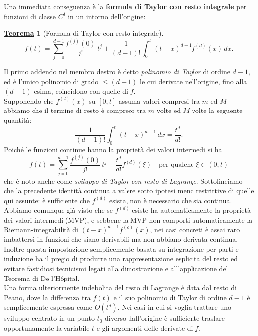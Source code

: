 \documentclass[a4paper,twoside]{article}
\theoremstyle{definition}
\newtheorem{theorem}{\color{Red}\underline{\textrm Teorema}}
\newenvironment{theo}
  {\begin{shaded}\begin{theorem}}
  {\end{theorem}\end{shaded}}
\numberwithin{theorem}{section}
\begin{document}
Una immediata conseguenza è la \textbf{formula di Taylor con resto integrale} per funzioni di classe $C^d$ in un intorno dell'origine:
\begin{theo}[Formula di Taylor con resto integrale]
 $$ f(t) = \sum_{j=0}^{d-1}\frac{f^{(j)}(0)}{j!}\,t^j + \frac{1}{(d-1)!}\int_{0}^{t}(t-x)^{d-1}f^{(d)}(x)\,dx. $$
\end{theo}
Il primo addendo nel membro destro è detto \emph{polinomio di Taylor} di ordine $d-1$, ed è l'unico polinomio di grado $\leq (d-1)$ le cui derivate nell'origine, fino alla $(d-1)$-esima, coincidono con quelle di $f$.\\
Supponendo che $f^{(d)}(x)$ su $[0,t]$ assuma valori compresi tra $m$ ed $M$ abbiamo che il termine di resto è compreso tra $m$ volte ed $M$ volte la seguente quantità:
$$ \frac{1}{(d-1)!}\int_{0}^{t}(t-x)^{d-1}\,dx = \frac{t^d}{d!}. $$
Poiché le funzioni continue hanno la proprietà dei valori intermedi si ha
$$ f(t) = \sum_{j=0}^{d-1}\frac{f^{(j)}(0)}{j!}\,t^j + \frac{t^d}{d!}f^{(d)}(\xi)\quad\text{per qualche }\xi\in(0,t) $$
che è noto anche come \emph{sviluppo di Taylor con resto di Lagrange}. Sottolineiamo che la precedente identità continua a valere sotto ipotesi meno restrittive di quelle qui assunte: è sufficiente che $f^{(d)}$ esista, non è necessario che sia continua. Abbiamo comunque già visto che se $f^{(d)}$ esiste ha automaticamente la proprietà dei valori intermedi (MVP), e sebbene la MVP non comporti automaticamente la Riemann-integrabilità di $(t-x)^{d-1}f^{(d)}(x)$, nei casi concreti è assai raro imbattersi in funzioni che siano derivabili ma non abbiano derivata continua. Inoltre questa impostazione semplicemente basata su integrazione per parti e induzione ha il pregio di produrre una rappresentazione esplicita del resto ed evitare fastidiosi tecnicismi legati alla dimostrazione e all'applicazione del Teorema di De l'H\^opital.\\
Una forma ulteriormente indebolita del resto di Lagrange è data dal resto di Peano, dove la differenza tra $f(t)$ e il suo polinomio di Taylor di ordine $d-1$ è semplicemente espressa come $O(t^d)$. Nei casi in cui si voglia trattare uno sviluppo centrato in un punto $t_0$ diverso dall'origine è sufficiente traslare opportunamente la variabile $t$ e gli argomenti delle derivate di $f$.\\
\end{document}
